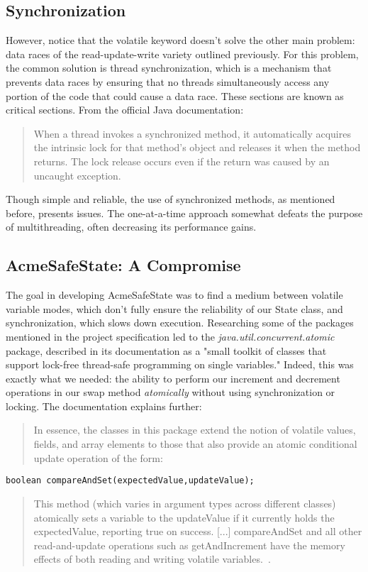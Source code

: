 \subsection{Synchronization}
However,  notice that the volatile keyword doesn't solve the other main problem: data races of the read-update-write variety outlined previously.  For this problem, the common
solution is thread synchronization, which is a mechanism that prevents data races by ensuring that no threads simultaneously access any portion of the code that could cause a 
data race. These sections are known as critical sections. From the official Java documentation:

\begin{quote}
When a thread invokes a synchronized method, it automatically acquires the intrinsic lock for that method's object and releases it when the method returns. The lock release occurs even if the return was caused by an uncaught exception.
\end{quote}

\noindent
Though simple and reliable, the use of synchronized methods, as mentioned before, presents issues. The one-at-a-time approach somewhat defeats the purpose of 
multithreading, often decreasing its performance gains.

\subsection{AcmeSafeState: A Compromise}
The goal in developing AcmeSafeState was to find a medium between volatile variable modes, which 
don't fully ensure the reliability of our State class, and synchronization, which slows down execution. Researching some of the packages mentioned in the project
specification led to the \emph{java.util.concurrent.atomic} package, described in its documentation as a "small toolkit of classes that support lock-free thread-safe programming on single variables."
Indeed, this was exactly what we needed: the ability to perform our increment and decrement operations in our swap method \emph{atomically} without using synchronization or locking.
The documentation explains further: 
\begin{quote}
In essence, the classes in this package extend the notion of volatile values, fields, and array elements to those that also provide an atomic conditional update operation of the form:
\end{quote}
\begin{verbatim} 
boolean compareAndSet(expectedValue,updateValue); 
\end{verbatim}
\begin{quote}
This method (which varies in argument types across different classes) atomically sets a variable to the updateValue if it currently holds the expectedValue, reporting true on success. [...]
compareAndSet and all other read-and-update operations such as getAndIncrement have the memory effects of both reading and writing volatile variables.~\cite{atomic}.
\end{quote}

